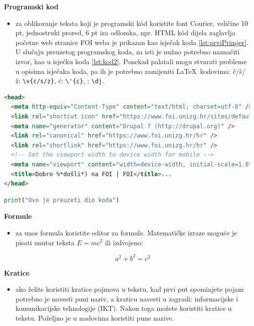 \documentclass[]{foi} %
\begin{document}
\textbf{Programski kod}
\begin{itemize}
	\item za oblikovanje teksta koji je programski kôd koristite font Courier, veličine 10 pt, jednostruki prored, 6 pt iza odlomka, npr. HTML kôd dijela zaglavlja početne web stranice FOI weba je prikazan kao isječak koda \ref{lst:prviPrimjer}. U slučaju preuzetog programskog koda, za isti je nužno potrebno naznačiti izvor, kao u isječku koda \ref{lst:kod2}. Ponekad palatali mogu stvarati probleme u opisima isječaka koda, pa ih je potrebno zamijeniti \LaTeX\ kodovima: \v{c}/\v{s}/\v{z}: \lstinline+\v{c/s/z}+, \'{c}: \lstinline+\'{c}+, \dj: \lstinline+\dj+.
\end{itemize}

\begin{lstlisting}[language=HTML, caption={Primjer zapisa isječka programskog kôda}, label=lst:prviPrimjer]
<head>
  <meta http-equiv="Content-Type" content="text/html; charset=utf-8" />
  <link rel="shortcut icon" href="https://www.foi.unizg.hr/sites/default/files/favicon_0_1.ico" type="image/vnd.microsoft.icon" />
  <meta name="generator" content="Drupal 7 (http://drupal.org)" />
  <link rel="canonical" href="https://www.foi.unizg.hr/hr" />
  <link rel="shortlink" href="https://www.foi.unizg.hr/hr" />
  <!-- Set the viewport width to device width for mobile -->
  <meta name="viewport" content="width=device-width, initial-scale=1.0">
  <title>Dobro %*došli*) na FOI | FOI</title>...
</head>
\end{lstlisting}

\begin{lstlisting}[language=Python, caption={
[Ovo je primjer koda koji je preuzet]
Ovo je primjer koda koji je preuzet iz \cite[str. 23]{Russell2010AImodern}}, label=lst:kod2]
print("Ovo je preuzeti dio koda")
\end{lstlisting}

\textbf{Formule}
\begin{itemize}
	\item za unos formula koristite editor za formule. Matematičke izraze moguće je pisati unutar teksta $E = mc^2$ ili izdvojeno:

	      $$
		      a^2 + b^2 = c^2
	      $$
\end{itemize}

\textbf{Kratice}
\begin{itemize}
	\item ako želite koristiti kratice pojmova u tekstu, kad prvi put spominjete pojam potrebno je navesti puni naziv, a kraticu navesti u zagradi: informacijske i komunikacijske tehnologije (IKT). Nakon toga možete koristiti kratice u tekstu. Poželjno je u naslovima koristiti pune nazive.
\end{itemize}
\end{document}
